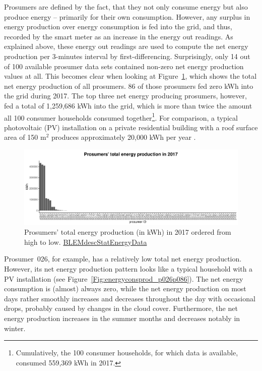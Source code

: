 Prosumers are defined by the fact, that they not only consume energy but also produce energy -- primarily for their own consumption. However, any surplus in energy production over energy consumption is fed into the grid, and thus, recorded by the smart meter as an increase in the energy out readings. As explained above, these energy out readings are used to compute the net energy production per 3-minutes interval by first-differencing. Surprisingly, only 14 out of 100 available prosumer data sets contained non-zero net energy production values at all. This becomes clear when looking at Figure~\ref{Fig:pros_total_production}, which shows the total net energy production of all prosumers. 86 of those prosumers fed zero kWh into the grid during 2017. The top three net energy producing prosumers, however, fed a total of 1,259,686 kWh into the grid, which is more than twice the amount all 100 consumer households consumed together\footnote{Cumulatively, the 100 consumer households, for which data is available, consumed 559,369 kWh in 2017.}. For comparison, a typical photovoltaic (PV) installation on a private residential building with a roof surface area of 150 m$^2$ produces approximately 20,000 kWh per year \citep{energieatlas:2018}.

\begin{figure}[htbp]
 \centering
\includegraphics[width=\textwidth]{thesis/graphs/prosumer_totalproduction.pdf}
\caption[Prosumers’ total energy production in 2017]{Prosumers’ total energy production (in kWh) in 2017 ordered from high to low. \quantnet\href{https://github.com/QuantLet/BLEM/tree/master/BLEMdescStatEnergyData}{BLEMdescStatEnergyData}}
\label{Fig:pros_total_production}
\end{figure}

Prosumer~026, for example, has a relatively low total net energy production. However, its net energy production pattern looks like a typical household with a PV installation (see Figure~\ref{Fig:energyconsprod_p026p086}). The net energy consumption is (almost) always zero, while the net energy production on most days rather smoothly increases and decreases throughout the day with occasional drops, probably caused by changes in the cloud cover. Furthermore, the net energy production increases in the summer months and decreases notably in winter.

